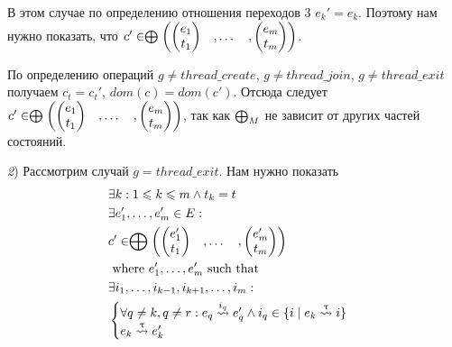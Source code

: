 В этом случае по определению отношения переходов 3 $e_k' = e_k$. Поэтому нам нужно показать, что
$c' \in \mathrel{\bigoplus}
\begin{pmatrix}
\begin{pmatrix}
e_1 \\
t_1 
\end{pmatrix}& ,
\dots& ,
\begin{pmatrix}
e_m \\
t_m 
\end{pmatrix}
\end{pmatrix}$.

По определению операций $g \neq thread\_create$, $g \neq thread\_join$, $g \neq thread\_exit$ получаем $c_t = c_t'$, $dom(c) = dom(c')$. Отсюда следует $c' \in \mathrel{\bigoplus}
\begin{pmatrix}
\begin{pmatrix}
e_1 \\
t_1 
\end{pmatrix}& ,
\dots& ,
\begin{pmatrix}
e_m \\
t_m 
\end{pmatrix}
\end{pmatrix}$, так как $\mathrel{\bigoplus}_M$ не зависит от других частей состояний.

{\textit 2)} Рассмотрим случай $g = thread\_exit$. Нам нужно показать 
\begin{align}
& \exists k : 1 \leqslant k \leqslant m \land t_k = t \nonumber \\
& \exists e_1', \dots, e_m' \in E: \nonumber \\
& c' \in \mathrel{\bigoplus}
\begin{pmatrix}
\begin{pmatrix}
e_1' \\
t_1 
\end{pmatrix}& ,
\dots& ,
\begin{pmatrix}
e_m' \\
t_m 
\end{pmatrix}
\end{pmatrix} \nonumber \\
& \mbox{ where } e_1', \dots, e_m' \mbox{ such that } \nonumber \\
&\exists i_1, \dots, i_{k-1}, i_{k+1}, \dots, i_m: \nonumber \\
&
\begin{cases}
\forall q \neq k, q \neq r: e_q \stackrel{i_q}{\leadsto} e_q' \land i_q \in \{i \mid e_k \stackrel{\uptau}{\leadsto} i\} \\
e_k \stackrel{\uptau}{\leadsto} e_k'
\end{cases} \nonumber 
\end{align}


